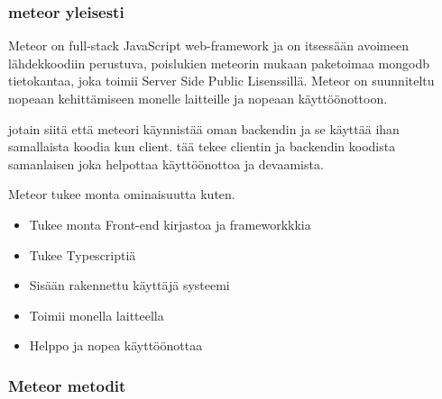 \documentclass[11pt,a4paper,titlepage,oneside]{article}
\begin{document}
\subsubsection{meteor yleisesti}









Meteor on full-stack JavaScript web-framework ja on itsessään avoimeen lähdekkoodiin perustuva, 
poislukien meteorin mukaan paketoimaa mongodb tietokantaa, joka toimii Server Side Public Lisenssillä.
Meteor on suunniteltu nopeaan kehittämiseen monelle laitteille ja nopeaan käyttöönottoon.
%
\medskip

jotain siitä että meteori käynnistää oman backendin ja se käyttää ihan samallaista koodia kun client.
tää tekee clientin ja backendin koodista samanlaisen joka helpottaa käyttöönottoa ja devaamista.
\medskip

    

Meteor tukee monta ominaisuutta kuten.
\begin{itemize}
    \item Tukee monta Front-end kirjastoa ja frameworkkkia
    \item Tukee Typescriptiä
    \item Sisään rakennettu käyttäjä systeemi
    \item Toimii monella laitteella
    \item Helppo ja nopea käyttöönottaa 
\end{itemize}





\subsubsection{Meteor metodit}
\end{document}

